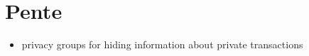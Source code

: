 \section{Pente}

\begin{itemize}
  \item privacy groups for hiding information about private transactions
\end{itemize}